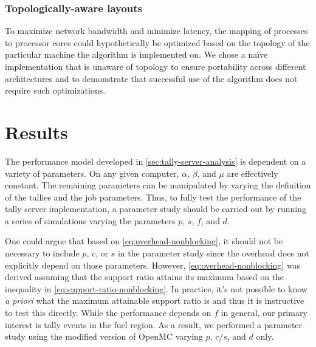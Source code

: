 \subsubsection{Topologically-aware layouts}

To maximize network bandwidth and minimize latency, the mapping of processes to
processor cores could hypothetically be optimized based on the topology of the
particular machine the algorithm is implemented on. We chose a naïve
implementation that is unaware of topology to ensure portability across
different architectures and to demonstrate that successful use of the algorithm
does not require such optimizations.

\section{Results}
\label{sec:results}

The performance model developed in \autoref{sec:tally-server-analysis} is dependent on a
variety of parameters. On any given computer, $\alpha$, $\beta$, and $\mu$ are
effectively constant. The remaining parameters can be manipulated by varying the
definition of the tallies and the job parameters. Thus, to fully test the
performance of the tally server implementation, a parameter study should be
carried out by running a series of simulations varying the parameters $p$, $s$,
$f$, and $d$.

One could argue that based on \eqref{eq:overhead-nonblocking}, it should not be
necessary to include $p$, $c$, or $s$ in the parameter study since the overhead
does not explicitly depend on those parameters. However,
\eqref{eq:overhead-nonblocking} was derived assuming that the support ratio
attains its maximum based on the inequality in
\eqref{eq:support-ratio-nonblocking}. In practice, it's not possible to know
\emph{a priori} what the maximum attainable support ratio is and thus it is
instructive to test this directly. While the performance depends on $f$ in
general, our primary interest is tally events in the fuel region. As a result,
we performed a parameter study using the modified version of OpenMC varying $p$,
$c/s$, and $d$ only.

